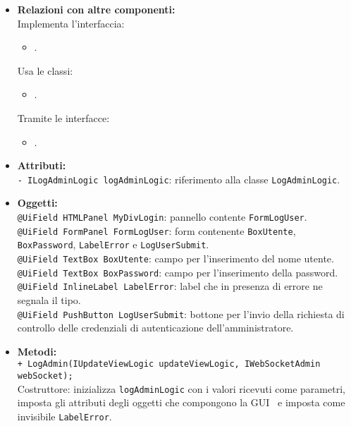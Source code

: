 {\begin{sloppypar}
{{{\begin{itemize}
				\item[]  \textbf{Relazioni con altre componenti:} \\
				Implementa l'interfaccia:
				\begin{itemize}
					\item[] .
				\end{itemize}
				Usa le classi:
				\begin{itemize}
		\item[]. 
				\end{itemize}
				Tramite le interfacce:
				\begin{itemize}
					\item[] .\\
				\end{itemize}

				\item[] \textbf{Attributi:}\\
					\texttt{- ILogAdminLogic logAdminLogic}: riferimento alla classe \texttt{LogAdminLogic}.\\
				
				\item[] \textbf{Oggetti:}\\
					\texttt{@UiField HTMLPanel MyDivLogin}: pannello contente \texttt{FormLogUser}.\\

					\texttt{@UiField FormPanel FormLogUser}: form contenente \texttt{BoxUtente}, \texttt{BoxPassword}, \texttt{LabelError} e \texttt{LogUserSubmit}.\\

					\texttt{@UiField TextBox BoxUtente}: campo per l'inserimento del nome utente.\\

					\texttt{@UiField TextBox BoxPassword}: campo per l'inserimento della password.\\

					\texttt{@UiField InlineLabel LabelError}: label che in presenza di errore ne segnala il tipo.\\

					\texttt{@UiField PushButton LogUserSubmit}: bottone per l'invio della richiesta di controllo delle credenziali di autenticazione dell'amministratore.\\
				
				\item[] \textbf{Metodi:}\\
					\texttt{+ LogAdmin(IUpdateViewLogic updateViewLogic, IWebSocketAdmin webSocket);}\\
					Costruttore: inizializza \texttt{logAdminLogic} con i valori ricevuti come parametri, imposta gli attributi degli oggetti che compongono la GUI\g~ e imposta come invisibile \texttt{LabelError}.\\


\end{itemize}}}}
\end{sloppypar}}
